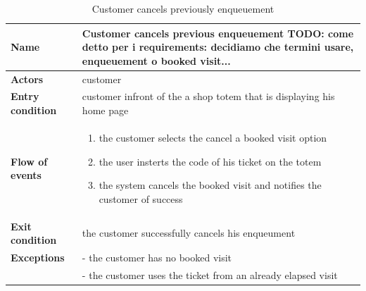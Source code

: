 \begin{table}[h!]
    \centering
    \begin{tabular}{@{}P{0.2\textwidth}P{0.70\textwidth}@{}}
        \toprule
        \textbf{Name}                 & Customer cancels previous enqueuement TODO: come detto per i requirements: decidiamo che termini usare, enqueuement o booked visit...\\
        \midrule
        \textbf{Actors}               & customer\\
        \textbf{Entry condition}      & customer infront of the a shop totem that is displaying his home page\\
        \textbf{Flow of events}       & 
        \begin{enumerate}[nolistsep, leftmargin=*]
            \item the customer selects the cancel a booked visit option
            \item the user insterts the code of his ticket on the totem
            \item the system cancels the booked visit and notifies the customer of success
        \end{enumerate} \\
        \textbf{Exit condition}       & the customer successfully cancels his enqueument\\
        \textbf{Exceptions}           
        & - the customer has no booked visit\\
        & - the customer uses the ticket from an already elapsed visit\\
        \bottomrule
    \end{tabular}
\caption{Customer cancels previously enqueuement}
\label{table:customercnacelspreviousenqueuement}
\end{table}

